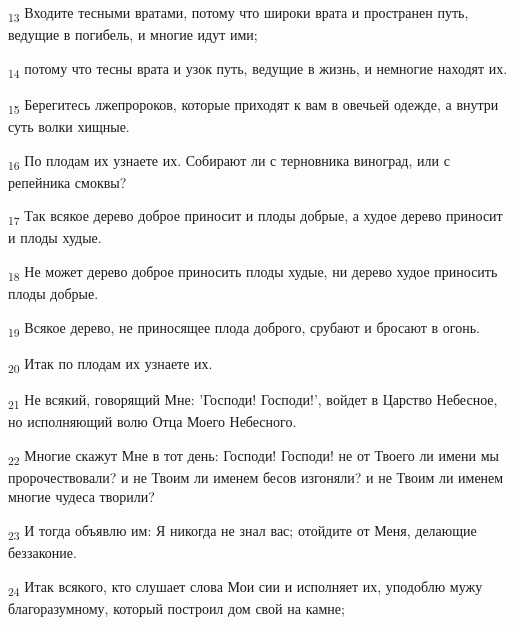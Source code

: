 \begin{tcolorbox}
\textsubscript{13} Входите тесными вратами, потому что широки врата и пространен путь, ведущие в погибель, и многие идут ими;
\end{tcolorbox}
\begin{tcolorbox}
\textsubscript{14} потому что тесны врата и узок путь, ведущие в жизнь, и немногие находят их.
\end{tcolorbox}
\begin{tcolorbox}
\textsubscript{15} Берегитесь лжепророков, которые приходят к вам в овечьей одежде, а внутри суть волки хищные.
\end{tcolorbox}
\begin{tcolorbox}
\textsubscript{16} По плодам их узнаете их. Собирают ли с терновника виноград, или с репейника смоквы?
\end{tcolorbox}
\begin{tcolorbox}
\textsubscript{17} Так всякое дерево доброе приносит и плоды добрые, а худое дерево приносит и плоды худые.
\end{tcolorbox}
\begin{tcolorbox}
\textsubscript{18} Не может дерево доброе приносить плоды худые, ни дерево худое приносить плоды добрые.
\end{tcolorbox}
\begin{tcolorbox}
\textsubscript{19} Всякое дерево, не приносящее плода доброго, срубают и бросают в огонь.
\end{tcolorbox}
\begin{tcolorbox}
\textsubscript{20} Итак по плодам их узнаете их.
\end{tcolorbox}
\begin{tcolorbox}
\textsubscript{21} Не всякий, говорящий Мне: 'Господи! Господи!', войдет в Царство Небесное, но исполняющий волю Отца Моего Небесного.
\end{tcolorbox}
\begin{tcolorbox}
\textsubscript{22} Многие скажут Мне в тот день: Господи! Господи! не от Твоего ли имени мы пророчествовали? и не Твоим ли именем бесов изгоняли? и не Твоим ли именем многие чудеса творили?
\end{tcolorbox}
\begin{tcolorbox}
\textsubscript{23} И тогда объявлю им: Я никогда не знал вас; отойдите от Меня, делающие беззаконие.
\end{tcolorbox}
\begin{tcolorbox}
\textsubscript{24} Итак всякого, кто слушает слова Мои сии и исполняет их, уподоблю мужу благоразумному, который построил дом свой на камне;
\end{tcolorbox}
